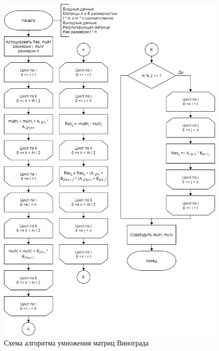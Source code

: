 \newpage 
\begin{figure}[h!]
	\begin{center}
		\includegraphics[scale=0.6]{assets/multVin.png}
	\end{center}
	\caption{Схема алгоритма умножения матриц Винограда}
\end{figure}

